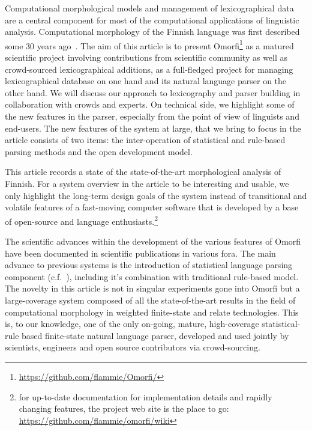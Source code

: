 \documentclass[a4paper,12pt]{article}
\begin{document}
Computational morphological models and management of lexicographical data
are a central component for most of the computational applications of
linguistic analysis. Computational morphology of the Finnish language was
first described some 30 years ago~\citep{koskenniemi1983twolevel}. The aim
of this article is to present Omorfi\footnote{
\url{https://github.com/flammie/Omorfi/}} as a matured scientific project
involving contributions from scientific community as well as crowd-sourced
lexicographical additions, as a full-fledged project for managing
lexicographical database on one hand and its natural language parser on the
other hand.  We will discuss our approach to lexicography and parser
building in collaboration with crowds and experts. On technical side, we
highlight some of the new features in the parser, especially from the point
of view of linguists and end-users. The new features of the system at large,
that we bring to focus in the article consists of two items: the
inter-operation of statistical and rule-based parsing methods and the open
development model.

This article records a state of the state-of-the-art morphological analysis
of Finnish. For a system overview in the article to be interesting and
usable, we only highlight the long-term design goals of the system instead
of transitional and volatile features of a fast-moving computer software
that is developed by a base of open-source and language
enthusiasts.\footnote{for up-to-date documentation for implementation
    details and rapidly changing features, the project web site is the place
to go: \url{https://github.com/flammie/omorfi/wiki}}

The scientific advances within the development of the various features of
Omorfi have been documented in scientific publications in various fora. The
main advance to previous systems is the introduction of statistical language
parsing component (c.f.~\citet{manning1999foundations}), including it's combination with
traditional rule-based model. The novelty in this article is not in singular
experiments gone into Omorfi but a large-coverage system composed of all the
state-of-the-art results in the field of computational morphology in
weighted finite-state and relate technologies. This is, to our knowledge,
one of the only on-going, mature, high-coverage statistical-rule based
finite-state natural language parser, developed and used jointly by
scientists, engineers and open source contributors via crowd-sourcing.
\end{document}
